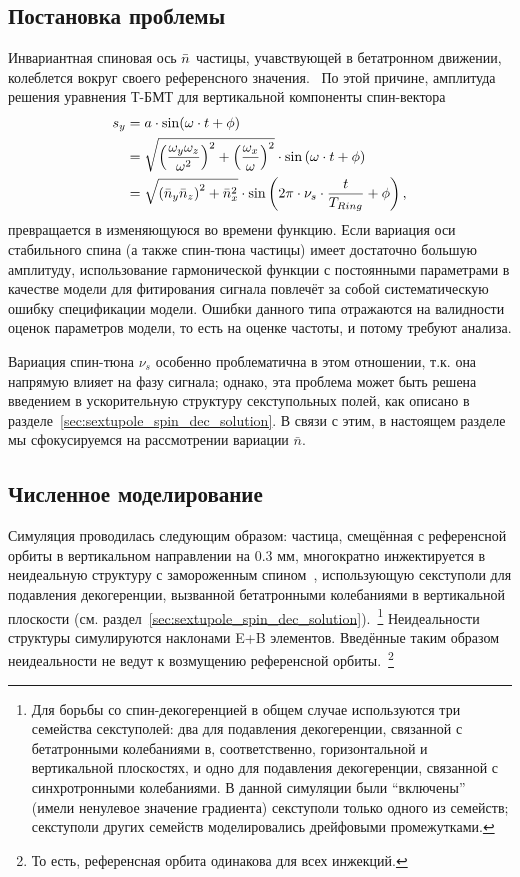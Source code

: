 
\subsection{Постановка проблемы}
Инвариантная спиновая ось $\bar n$ частицы, учавствующей в бетатронном движении, 
колеблется вокруг своего референсного значения.~\cite[стр.~11]{Shatunov} 
По этой причине, амплитуда решения уравнения Т-БМТ для вертикальной компоненты спин-вектора
\begin{align}
s_y &= a\cdot\sin(\w\cdot t + \phi) \notag\\
&= \sqrt{\bkt{\frac{\w_y\w_z}{\w^2}}^2 + \bkt{\frac{\w_x}{\w}}^2}\cdot\sin\bkt{\w\cdot t + \phi}\notag\\
&= \sqrt{\bkt{\bar n_y\bar n_z}^2 + \bar n_x^2} \cdot \sin\bkt{2\pi\cdot\nu_s\cdot \frac{t}{T_{Ring}} + \phi},\label{eq:sy_varying_amplitude}
\end{align}
превращается в изменяющуюся во времени функцию. Если вариация оси стабильного спина (а также спин-тюна частицы) имеет достаточно большую амплитуду, использование гармонической функции с постоянными параметрами в качестве модели для фитирования сигнала повлечёт за собой систематическую ошибку спецификации модели. Ошибки данного типа отражаются на валидности оценок параметров модели, то есть на оценке частоты, и потому требуют анализа.

Вариация спин-тюна $\nu_s$ особенно проблематична в этом отношении, т.к. она напрямую влияет на фазу сигнала; однако, эта проблема может быть решена введением в ускорительную структуру секступольных полей, как описано в разделе~\ref{sec:sextupole_spin_dec_solution}. В связи с этим, в настоящем разделе мы сфокусируемся на рассмотрении вариации $\bar n$.

\subsection{Численное моделирование}
Симуляция проводилась следующим образом: частица, смещённая с референсной орбиты в вертикальном направлении
на 0.3 мм, многократно инжектируется в неидеальную структуру с замороженным спином~\cite{Senichev:Lattices},
использующую секступоли для подавления декогеренции, вызванной бетатронными колебаниями
в вертикальной плоскости (см. раздел~\ref{sec:sextupole_spin_dec_solution}).~\footnote{Для борьбы 
	со спин-декогеренцией в общем случае используются три семейства секступолей: 
	два для подавления декогеренции, связанной с бетатронными колебаниями в, соответственно, 
	горизонтальной и вертикальной плоскостях, и одно для подавления декогеренции, 
	связанной с синхротронными колебаниями. В данной симуляции были ``включены'' 
	(имели ненулевое значение градиента) секступоли только одного из семейств; 
	секступоли других семейств моделировались дрейфовыми промежутками.}
Неидеальности структуры симулируются наклонами E+B элементов.
Введённые таким образом неидеальности не ведут к возмущению референсной орбиты.~\footnote{То есть,
референсная орбита 
одинакова для всех инжекций.}

